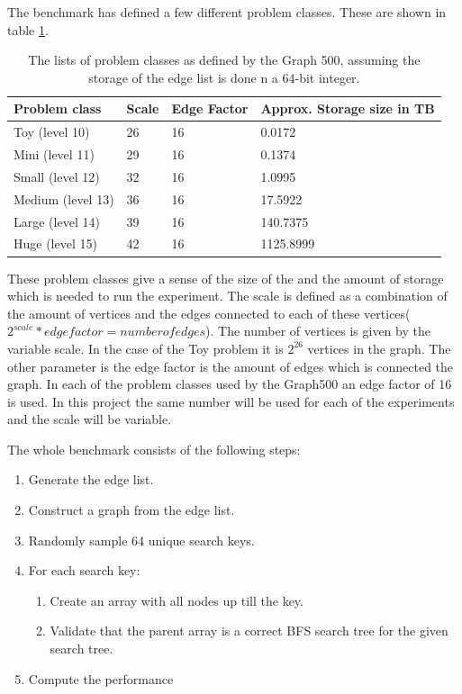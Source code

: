 The benchmark has defined a few different problem classes. These are shown in table \ref{tab:problem_scales}. 
\begin{table}[!h]
	\begin{center}
	\begin{tabular}{|l|l|l|l|}
		\hline
		Problem class     & Scale & Edge Factor & Approx. Storage size in TB \\ \hline
		Toy (level 10)    & 26    & 16          & 0.0172                     \\ \hline
		Mini (level 11)   & 29    & 16          & 0.1374                     \\ \hline
		Small (level 12)  & 32    & 16          & 1.0995                     \\ \hline
		Medium (level 13) & 36    & 16          & 17.5922                    \\ \hline
		Large (level 14)  & 39    & 16          & 140.7375                   \\ \hline
		Huge (level 15)   & 42    & 16          & 1125.8999                  \\ \hline
	\end{tabular}
	\caption{The lists of problem classes as defined by the Graph 500, assuming the storage of the edge list is done n a 64-bit integer.}
	\label{tab:problem_scales}
	\end{center}
\end{table}
These problem classes give a sense of the size of the  and the amount of storage which is needed to run the experiment. The scale is defined as a combination of the amount of vertices and the edges connected to each of these vertices($2^{scale} * edgefactor = number of edges$). The number of vertices is given by the variable scale. In the case of the Toy  problem it is $2^26$ vertices in the graph. The other parameter is the edge factor is the amount of edges which is connected the graph. In each of the problem classes used by the Graph500 an edge factor of 16 is used. In this project the same number will be used for each of the experiments and the scale will be variable.

The whole benchmark consists of the following steps:
\begin{enumerate}
	\item Generate the edge list.
	\item Construct a graph from the edge list.
	\item Randomly sample 64 unique search keys.
	\item For each search key:
	\begin{enumerate}
		\item Create an array with all nodes up till the key.
		\item Validate that the parent array is a correct BFS search tree for the given search tree.
	\end{enumerate}
	\item Compute the performance
\end{enumerate}


